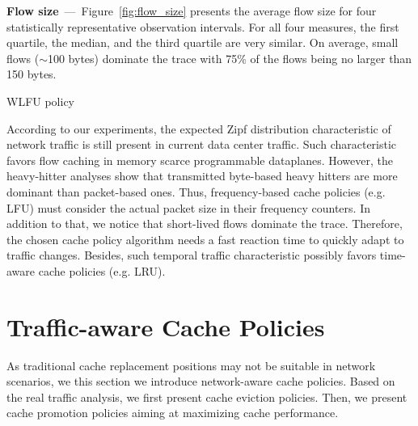 \textbf{Flow size}~---~Figure~\ref{fig:flow_size} presents the average flow size for four statistically representative observation intervals.
For all four measures, the first quartile, the median, and the third quartile are very similar.
On average, small flows ($\sim$100 bytes) dominate the trace with 75\% of the flows being no larger than 150 bytes.
\begin{algorithm}[t]
	\caption{WLFU policy}
	\label{algo:wlfu}
	\SetInd{0.1em}{.9em}
	\SetAlgoLined
	\footnotesize
\end{algorithm}
According to our experiments, the expected Zipf distribution characteristic of network traffic is still present in current data center traffic.
Such characteristic favors flow caching in memory scarce programmable dataplanes.
However, the heavy-hitter analyses show that transmitted byte-based heavy hitters are more dominant than packet-based ones.
Thus, frequency-based cache policies (e.g. LFU) must consider the actual packet size in their frequency counters.
In addition to that, we notice that short-lived flows dominate the trace.
Therefore, the chosen cache policy algorithm needs a fast reaction time to quickly adapt to traffic changes.
Besides, such temporal traffic characteristic possibly favors time-aware cache policies (e.g. LRU).

\section{Traffic-aware Cache Policies}\label{sec:policies}
As traditional cache replacement positions may not be suitable in network scenarios, we this section we introduce network-aware cache policies.
Based on the real traffic analysis, we first present cache eviction policies.
Then, we present cache promotion policies aiming at maximizing cache performance.

